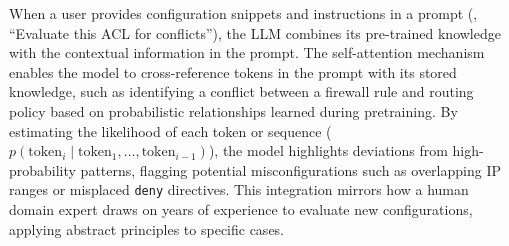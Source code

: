 
When a user provides configuration snippets and instructions in a prompt (\eg, “Evaluate this ACL for conflicts”), the LLM combines its pre-trained knowledge with the contextual information in the prompt. The self-attention mechanism enables the model to cross-reference tokens in the prompt with its stored knowledge, such as identifying a conflict between a firewall rule and routing policy based on probabilistic relationships learned during pretraining. By estimating the likelihood of each token or sequence (\(p(\text{token}_i \mid \text{token}_1, \ldots, \text{token}_{i-1})\)), the model highlights deviations from high-probability patterns, flagging potential misconfigurations such as overlapping IP ranges or misplaced \texttt{deny} directives. This integration mirrors how a human domain expert draws on years of experience to evaluate new configurations, applying abstract principles to specific cases.


